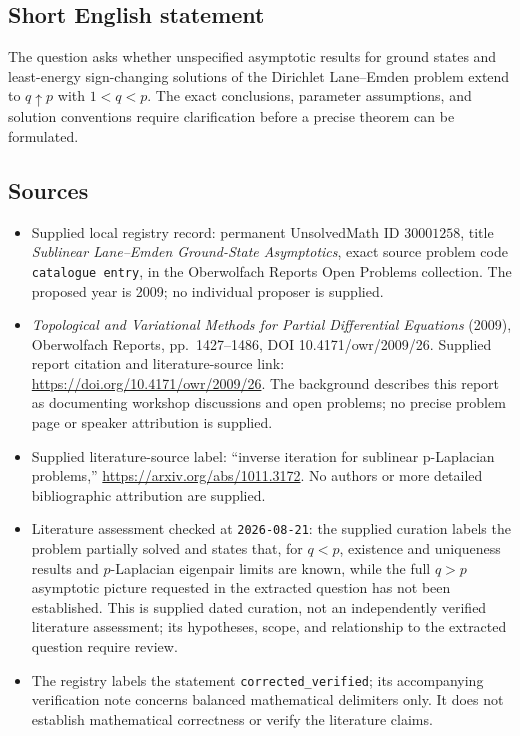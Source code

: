 \documentclass[11pt]{article}
\begin{document}
\subsection{Short English statement}
The question asks whether unspecified asymptotic results for ground states and least-energy sign-changing solutions of the Dirichlet Lane--Emden problem extend to \(q\uparrow p\) with \(1<q<p\). The exact conclusions, parameter assumptions, and solution conventions require clarification before a precise theorem can be formulated.
\subsection{Sources}
\begin{itemize}
\item Supplied local registry record: permanent UnsolvedMath ID \(30001258\), title \emph{Sublinear Lane--Emden Ground-State Asymptotics}, exact source problem code \texttt{catalogue entry}, in the Oberwolfach Reports Open Problems collection. The proposed year is 2009; no individual proposer is supplied.
\item \emph{Topological and Variational Methods for Partial Differential Equations} (2009), Oberwolfach Reports, pp.\ 1427--1486, DOI 10.4171/owr/2009/26. Supplied report citation and literature-source link: \url{https://doi.org/10.4171/owr/2009/26}. The background describes this report as documenting workshop discussions and open problems; no precise problem page or speaker attribution is supplied.
\item Supplied literature-source label: ``inverse iteration for sublinear p-Laplacian problems,'' \url{https://arxiv.org/abs/1011.3172}. No authors or more detailed bibliographic attribution are supplied.
\item Literature assessment checked at \texttt{2026-08-21}: the supplied curation labels the problem partially solved and states that, for \(q<p\), existence and uniqueness results and \(p\)-Laplacian eigenpair limits are known, while the full \(q>p\) asymptotic picture requested in the extracted question has not been established. This is supplied dated curation, not an independently verified literature assessment; its hypotheses, scope, and relationship to the extracted question require review.
\item The registry labels the statement \texttt{corrected\_verified}; its accompanying verification note concerns balanced mathematical delimiters only. It does not establish mathematical correctness or verify the literature claims.
\end{itemize}
\end{document}
